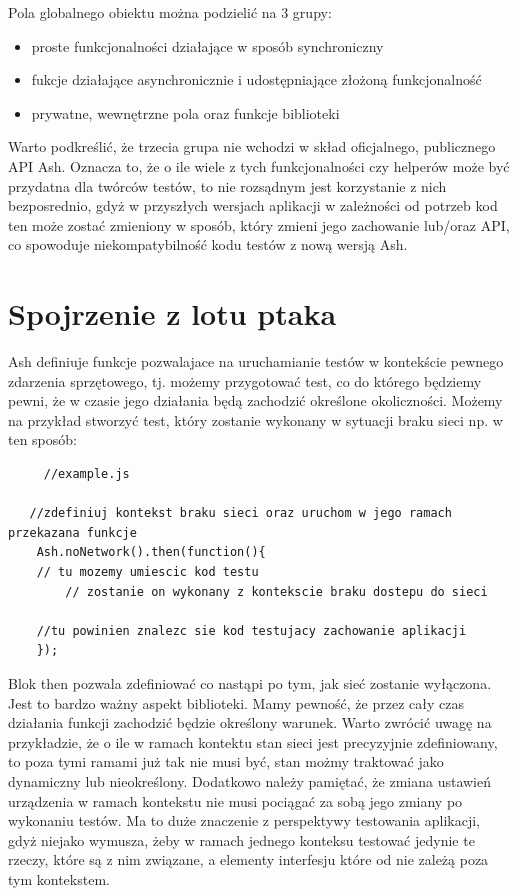 \documentclass[brudnopis]{xmgr}
\begin{document}
Pola globalnego obiektu można podzielić na 3 grupy:  
\begin{itemize}
  \item proste funkcjonalności działające w sposób synchroniczny
  \item fukcje działające asynchronicznie i udostępniające złożoną funkcjonalność 
  \item prywatne, wewnętrzne pola oraz funkcje biblioteki
\end{itemize}
Warto podkreślić, że trzecia grupa nie wchodzi w skład oficjalnego, publicznego API Ash. Oznacza to, że o ile wiele z tych funkcjonalności czy helperów może być przydatna dla twórców testów, to nie rozsądnym jest korzystanie z nich bezposrednio, gdyż w przyszłych wersjach aplikacji w zależności od potrzeb kod ten może zostać zmieniony w sposób, który zmieni jego zachowanie lub/oraz API, co spowoduje niekompatybilność kodu testów z nową wersją Ash.

\section{Spojrzenie z lotu ptaka}

Ash definiuje funkcje pozwalajace na uruchamianie testów w kontekście pewnego zdarzenia sprzętowego, tj. możemy przygotować test, co do którego będziemy pewni, że w czasie jego działania będą zachodzić określone okoliczności. Możemy na przykład stworzyć test, który zostanie wykonany w sytuacji braku sieci np. w ten sposób:

\begin{lstlisting}
     //example.js

   //zdefiniuj kontekst braku sieci oraz uruchom w jego ramach przekazana funkcje
    Ash.noNetwork().then(function(){
	// tu mozemy umiescic kod testu
     	// zostanie on wykonany z kontekscie braku dostepu do sieci

	//tu powinien znalezc sie kod testujacy zachowanie aplikacji 
    });
\end{lstlisting}

Blok then pozwala zdefiniować co nastąpi po tym, jak sieć zostanie wyłączona. Jest to bardzo ważny aspekt biblioteki. Mamy pewność, że przez cały czas działania funkcji zachodzić będzie określony warunek. Warto zwrócić uwagę na przykładzie, że o ile w ramach kontektu stan sieci jest precyzyjnie zdefiniowany, to poza tymi ramami już tak nie musi być, stan możmy traktować jako dynamiczny lub nieokreślony. Dodatkowo należy pamiętać, że zmiana ustawień urządzenia w ramach kontekstu nie musi pociągać za sobą jego zmiany po wykonaniu testów. Ma to duże znaczenie z perspektywy testowania aplikacji, gdyż niejako wymusza, żeby w ramach jednego konteksu testować jedynie te rzeczy, które są z nim związane, a elementy interfesju które od nie zależą poza tym kontekstem.
\end{document}
